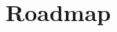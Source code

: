 \documentclass{article}
\begin{document}
\section{Roadmap}
\label{sec:roadmap}


\appendix
\clearpage


\printbibliography[title={References}]


\end{document}
